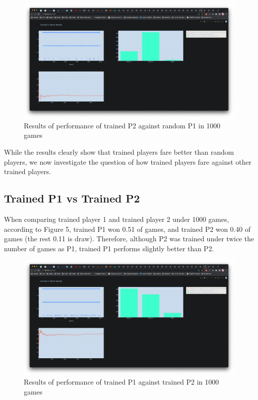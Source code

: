 \documentclass{article}
\begin{document}
\begin{figure}[h]
    \centering
    \includegraphics[scale=0.24]{images/4.png}
    \caption{Results of performance of trained P2 against random P1 in 1000 games}
    \label{fig:my_label}
\end{figure}

While the results clearly show that trained players fare better than random players, we now investigate the question of how trained players fare against other trained players. 

\subsection{Trained P1 vs Trained P2}

When comparing trained player 1 and trained player 2 under 1000 games, according to Figure 5, trained P1 won 0.51 of games, and trained P2 won 0.40 of games (the rest 0.11 is draw). Therefore, although P2 was trained under twice the number of games as P1, trained P1 performs slightly better than P2.

\begin{figure}[h]
    \centering
    \includegraphics[scale=0.24]{images/5.png}
    \caption{Results of performance of trained P1 against trained P2 in 1000 games}
    \label{fig:my_label}
\end{figure}
\end{document}
